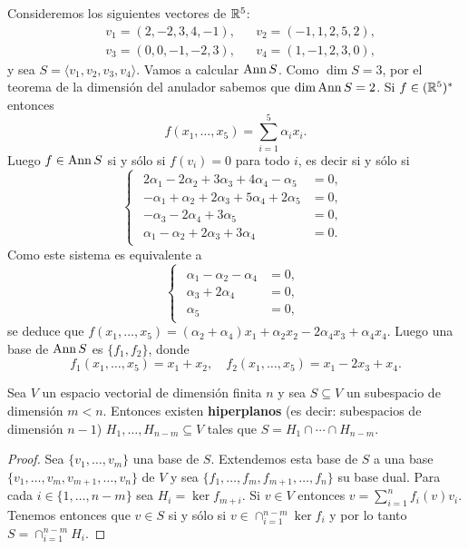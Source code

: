 \begin{example}
	Consideremos los siguientes vectores de $\mathbb{R}^5$:
	\begin{align*}
		&v_1=(2,-2,3,4,-1), 
		&& v_2=(-1,1,2,5,2),\\
		& v_3=(0,0,-1,-2,3),
		&& v_4=(1,-1,2,3,0),
	\end{align*}
	 y sea $S=\langle v_1,v_2,v_3,v_4\rangle$. 
	 Vamos a calcular $\operatorname{Ann} S$.  Como $\dim S=3$, por el teorema de la
	 dimensión del anulador sabemos que $\dim\operatorname{Ann} S=2$. Si $f\in(\mathbb{R}^5)^*$ entonces
	 \[
	 	f(x_1,\dots,x_5)=\sum_{i=1}^5\alpha_ix_i. 
  	 \]
	 Luego $f\in\operatorname{Ann} S$ si y sólo si $f(v_i)=0$ para todo $i$, es decir si y sólo si
	 \[
		\begin{cases}
			\begin{aligned}
			2\alpha_1-2\alpha_2+3\alpha_3+4\alpha_4-\alpha_5 &=0,\\
			-\alpha_1+\alpha_2+2\alpha_3+5\alpha_4+2\alpha_5 &=0,\\
			-\alpha_3-2\alpha_4+3\alpha_5 &=0,\\
			\alpha_1-\alpha_2+2\alpha_3+3\alpha_4 &=0.
			\end{aligned}
		\end{cases}
	 \]
	 Como este sistema es equivalente a
	 \[
		\begin{cases}
			\begin{aligned}
				\alpha_1-\alpha_2-\alpha_4 &=0, \\
				\alpha_3+2\alpha_4 &= 0,\\
				\alpha_5 &=0,
			\end{aligned}
		\end{cases}
	 \]
	 se deduce que
	 $f(x_1,\dots,x_5)=(\alpha_2+\alpha_4)x_1+\alpha_2x_2-2\alpha_4x_3+\alpha_4x_4$.
	 Luego una base de $\operatorname{Ann} S$ es $\{f_1,f_2\}$, donde 
	 \[
	 	f_1(x_1,\dots,x_5)=x_1+x_2,\quad 
		f_2(x_1,\dots,x_5)=x_1-2x_3+x_4. 
	 \]
\end{example}

\begin{cor}
	Sea $V$ un espacio vectorial de dimensión finita $n$ y sea $S\subseteq V$
	un subespacio de dimensión $m<n$.  Entonces existen \textbf{hiperplanos}
	(es decir: subespacios de dimensión $n-1$) $H_1,\dots,H_{n-m}\subseteq V$
	tales que $S=H_1\cap\cdots\cap H_{n-m}$. 

	\begin{proof}
		Sea $\{v_1,\dots,v_m\}$ una base de $S$. Extendemos esta base de $S$ a
		una base $\{v_1,\dots,v_m,v_{m+1},\dots,v_n\}$ de $V$ y sea
		$\{f_1,\dots,f_m,f_{m+1},\dots,f_n\}$ su base dual.  Para cada
		$i\in\{1,\dots,n-m\}$ sea $H_i=\ker f_{m+i}$. Si $v\in V$ entonces
		$v=\sum_{i=1}^n f_i(v)v_i$. Tenemos entonces que $v\in S$ si y sólo si
		$v\in\cap_{i=1}^{n-m}\ker f_i$ y por lo tanto $S=\cap_{i=1}^{n-m}H_i$.
	\end{proof}
\end{cor}

